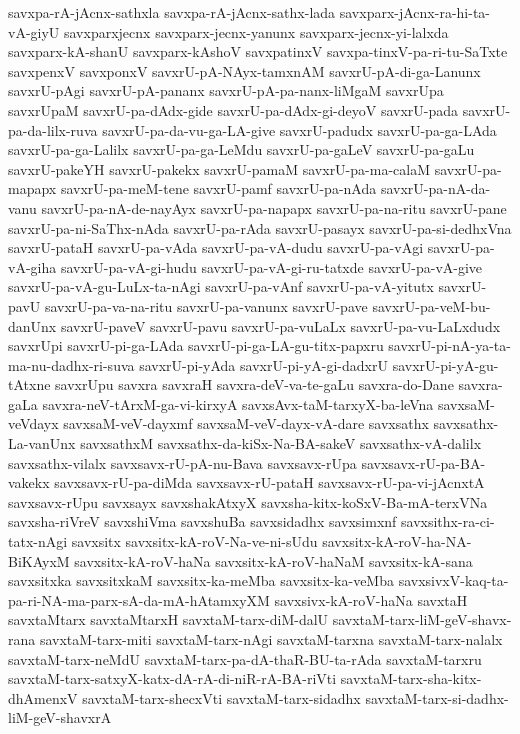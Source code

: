 {savxpa-rA-jAcnx-sathxla
savxpa-rA-jAcnx-sathx-lada
savxparx-jAcnx-ra-hi-ta-vA-giyU
savxparxjecnx
savxparx-jecnx-yanunx
savxparx-jecnx-yi-lalxda
savxparx-kA-shanU
savxparx-kAshoV
savxpatinxV
savxpa-tinxV-pa-ri-tu-SaTxte
savxpenxV
savxponxV
savxrU-pA-NAyx-tamxnAM
savxrU-pA-di-ga-Lanunx
savxrU-pAgi
savxrU-pA-pananx
savxrU-pA-pa-nanx-liMgaM
savxrUpa
savxrUpaM
savxrU-pa-dAdx-gide
savxrU-pa-dAdx-gi-deyoV
savxrU-pada
savxrU-pa-da-lilx-ruva
savxrU-pa-da-vu-ga-LA-give
savxrU-padudx
savxrU-pa-ga-LAda
savxrU-pa-ga-Lalilx
savxrU-pa-ga-LeMdu
savxrU-pa-gaLeV
savxrU-pa-gaLu
savxrU-pakeYH
savxrU-pakekx
savxrU-pamaM
savxrU-pa-ma-calaM
savxrU-pa-mapapx
savxrU-pa-meM-tene
savxrU-pamf
savxrU-pa-nAda
savxrU-pa-nA-da-vanu
savxrU-pa-nA-de-nayAyx
savxrU-pa-napapx
savxrU-pa-na-ritu
savxrU-pane
savxrU-pa-ni-SaThx-nAda
savxrU-pa-rAda
savxrU-pasayx
savxrU-pa-si-dedhxVna
savxrU-pataH
savxrU-pa-vAda
savxrU-pa-vA-dudu
savxrU-pa-vAgi
savxrU-pa-vA-giha
savxrU-pa-vA-gi-hudu
savxrU-pa-vA-gi-ru-tatxde
savxrU-pa-vA-give
savxrU-pa-vA-gu-LuLx-ta-nAgi
savxrU-pa-vAnf
savxrU-pa-vA-yitutx
savxrU-pavU
savxrU-pa-va-na-ritu
savxrU-pa-vanunx
savxrU-pave
savxrU-pa-veM-bu-danUnx
savxrU-paveV
savxrU-pavu
savxrU-pa-vuLaLx
savxrU-pa-vu-LaLxdudx
savxrUpi
savxrU-pi-ga-LAda
savxrU-pi-ga-LA-gu-titx-papxru
savxrU-pi-nA-ya-ta-ma-nu-dadhx-ri-suva
savxrU-pi-yAda
savxrU-pi-yA-gi-dadxrU
savxrU-pi-yA-gu-tAtxne
savxrUpu
savxra
savxraH
savxra-deV-va-te-gaLu
savxra-do-Dane
savxra-gaLa
savxra-neV-tArxM-ga-vi-kirxyA
savxsAvx-taM-tarxyX-ba-leVna
savxsaM-veVdayx
savxsaM-veV-dayxmf
savxsaM-veV-dayx-vA-dare
savxsathx
savxsathx-La-vanUnx
savxsathxM
savxsathx-da-kiSx-Na-BA-sakeV
savxsathx-vA-dalilx
savxsathx-vilalx
savxsavx-rU-pA-nu-Bava
savxsavx-rUpa
savxsavx-rU-pa-BA-vakekx
savxsavx-rU-pa-diMda
savxsavx-rU-pataH
savxsavx-rU-pa-vi-jAcnxtA
savxsavx-rUpu
savxsayx
savxshakAtxyX
savxsha-kitx-koSxV-Ba-mA-terxVNa
savxsha-riVreV
savxshiVma
savxshuBa
savxsidadhx
savxsimxnf
savxsithx-ra-ci-tatx-nAgi
savxsitx
savxsitx-kA-roV-Na-ve-ni-sUdu
savxsitx-kA-roV-ha-NA-BiKAyxM
savxsitx-kA-roV-haNa
savxsitx-kA-roV-haNaM
savxsitx-kA-sana
savxsitxka
savxsitxkaM
savxsitx-ka-meMba
savxsitx-ka-veMba
savxsivxV-kaq-ta-pa-ri-NA-ma-parx-sA-da-mA-hAtamxyXM
savxsivx-kA-roV-haNa
savxtaH
savxtaMtarx
savxtaMtarxH
savxtaM-tarx-diM-dalU
savxtaM-tarx-liM-geV-shavx-rana
savxtaM-tarx-miti
savxtaM-tarx-nAgi
savxtaM-tarxna
savxtaM-tarx-nalalx
savxtaM-tarx-neMdU
savxtaM-tarx-pa-dA-thaR-BU-ta-rAda
savxtaM-tarxru
savxtaM-tarx-satxyX-katx-dA-rA-di-niR-rA-BA-riVti
savxtaM-tarx-sha-kitx-dhAmenxV
savxtaM-tarx-shecxVti
savxtaM-tarx-sidadhx
savxtaM-tarx-si-dadhx-liM-geV-shavxrA
}
